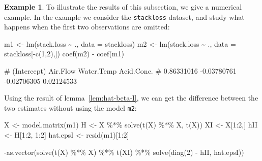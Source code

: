 \documentclass[
  a4paper,
]{article}
\newenvironment{Shaded}{\begin{snugshade}}{\end{snugshade}}
\newcommand{\AttributeTok}[1]{\textcolor[rgb]{0.77,0.63,0.00}{#1}}
\newcommand{\DecValTok}[1]{\textcolor[rgb]{0.00,0.00,0.81}{#1}}
\newcommand{\FunctionTok}[1]{\textcolor[rgb]{0.00,0.00,0.00}{#1}}
\newcommand{\NormalTok}[1]{#1}
\newcommand{\OtherTok}[1]{\textcolor[rgb]{0.56,0.35,0.01}{#1}}
\newcommand{\SpecialCharTok}[1]{\textcolor[rgb]{0.00,0.00,0.00}{#1}}
\theoremstyle{definition}
\theoremstyle{definition}
\newtheorem{example}{Example}[section]
\theoremstyle{definition}
\theoremstyle{definition}
\theoremstyle{remark}
\begin{document}
\begin{example}
To illustrate the results of this subsection, we give a numerical example.
In the example we consider the \texttt{stackloss} dataset, and study what happens
when the first two observations are omitted:

\begin{Shaded}
\begin{Highlighting}[]
\NormalTok{m1 }\OtherTok{\textless{}{-}} \FunctionTok{lm}\NormalTok{(stack.loss }\SpecialCharTok{\textasciitilde{}}\NormalTok{ ., }\AttributeTok{data =}\NormalTok{ stackloss)}
\NormalTok{m2 }\OtherTok{\textless{}{-}} \FunctionTok{lm}\NormalTok{(stack.loss }\SpecialCharTok{\textasciitilde{}}\NormalTok{ ., }\AttributeTok{data =}\NormalTok{ stackloss[}\SpecialCharTok{{-}}\FunctionTok{c}\NormalTok{(}\DecValTok{1}\NormalTok{,}\DecValTok{2}\NormalTok{),])}
\FunctionTok{coef}\NormalTok{(m2) }\SpecialCharTok{{-}} \FunctionTok{coef}\NormalTok{(m1)}
\end{Highlighting}
\end{Shaded}

\begin{Shaded}
\begin{Highlighting}[]
\NormalTok{\# (Intercept)    Air.Flow  Water.Temp  Acid.Conc. }
\NormalTok{\#  0.86331016 {-}0.03780761 {-}0.02706305  0.02124533}
\end{Highlighting}
\end{Shaded}

Using the result of lemma~\ref{lem:hat-beta-I}, we can get the difference
between the two estimates without using the model \texttt{m2}:

\begin{Shaded}
\begin{Highlighting}[]
\NormalTok{X }\OtherTok{\textless{}{-}} \FunctionTok{model.matrix}\NormalTok{(m1)}
\NormalTok{H }\OtherTok{\textless{}{-}}\NormalTok{ X }\SpecialCharTok{\%*\%} \FunctionTok{solve}\NormalTok{(}\FunctionTok{t}\NormalTok{(X) }\SpecialCharTok{\%*\%}\NormalTok{ X, }\FunctionTok{t}\NormalTok{(X))}
\NormalTok{XI }\OtherTok{\textless{}{-}}\NormalTok{ X[}\DecValTok{1}\SpecialCharTok{:}\DecValTok{2}\NormalTok{,]}
\NormalTok{hII }\OtherTok{\textless{}{-}}\NormalTok{ H[}\DecValTok{1}\SpecialCharTok{:}\DecValTok{2}\NormalTok{, }\DecValTok{1}\SpecialCharTok{:}\DecValTok{2}\NormalTok{]}
\NormalTok{hat.epsI }\OtherTok{\textless{}{-}} \FunctionTok{resid}\NormalTok{(m1)[}\DecValTok{1}\SpecialCharTok{:}\DecValTok{2}\NormalTok{]}

\SpecialCharTok{{-}}\FunctionTok{as.vector}\NormalTok{(}\FunctionTok{solve}\NormalTok{(}\FunctionTok{t}\NormalTok{(X) }\SpecialCharTok{\%*\%}\NormalTok{ X) }\SpecialCharTok{\%*\%} \FunctionTok{t}\NormalTok{(XI) }\SpecialCharTok{\%*\%} \FunctionTok{solve}\NormalTok{(}\FunctionTok{diag}\NormalTok{(}\DecValTok{2}\NormalTok{) }\SpecialCharTok{{-}}\NormalTok{ hII, hat.epsI))}
\end{Highlighting}
\end{Shaded}


\end{example}
\end{document}
